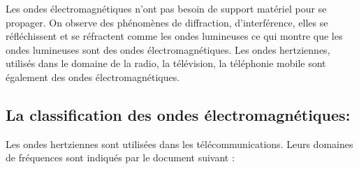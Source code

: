 \documentclass[12pt]{article}
\begin{document}
\begin{center}


\end{center}
Les ondes électromagnétiques n’ont pas besoin de support matériel pour se
propager. On observe des phénomènes de diffraction, d’interférence, elles se réfléchissent et se réfractent
comme les ondes lumineuses ce qui montre que les ondes lumineuses sont des ondes électromagnétiques.
Les ondes hertziennes, utilisés dans le domaine de la radio, la télévision, la téléphonie mobile sont également
des ondes électromagnétiques.

\subsection{ La classification des ondes  électromagnétiques:}
Les ondes hertziennes sont utilisées dans les télécommunications. Leurs domaines de fréquences sont
indiqués par le document suivant :
\end{document}
